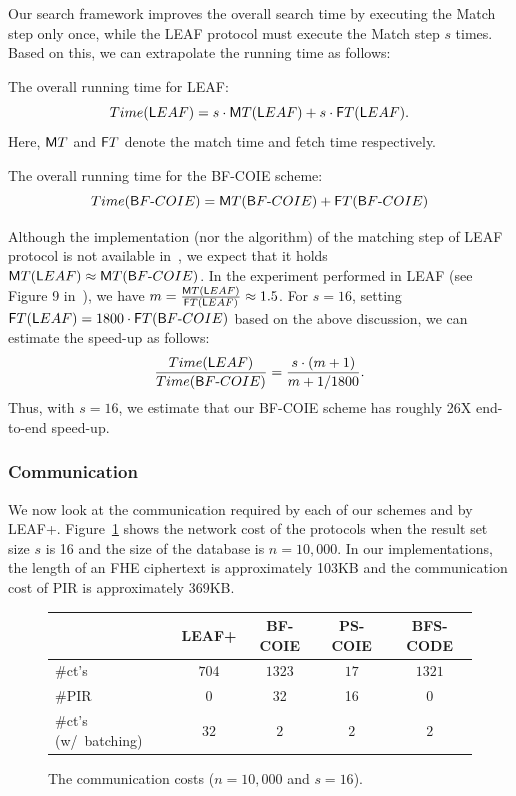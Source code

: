 Our search framework improves the overall search time by executing the Match
step only once, while the LEAF protocol must execute the Match step $s$ times.
Based on this, we can extrapolate the running time as follows: 

\BI
\item The overall running time for LEAF: 
$$ Time({\sf LEAF}) = s \cdot {\sf MT}({\sf LEAF})
  + s \cdot {\sf FT}({\sf LEAF}).$$ Here, $\sf MT$ and $\sf FT$ denote the
  match time and fetch time respectively. 

\item The overall running time for the BF-COIE scheme: $$Time({\sf
BF\mbox{-}COIE}) = {\sf MT}({\sf BF\mbox{-}COIE})
  + {\sf FT}({\sf BF\mbox{-}COIE})$$
\EI

Although the implementation (nor the algorithm) of the matching step of
LEAF protocol is not available in~\cite{CCS:WYXZ20}, we expect that it
holds 
${\sf MT}({\sf LEAF}) \approx {\sf MT}({\sf BF\mbox{-}COIE})$. 
%
In the experiment performed in LEAF (see Figure 9 in~\cite{CCS:WYXZ20}),
we have $m = \frac{ {\sf MT}({\sf LEAF})}{{\sf FT}({\sf LEAF})} \approx
1.5$.
%
For $s=16$, setting $ {\sf FT}({\sf LEAF}) = 1800 \cdot {\sf FT}({\sf
BF\mbox{-}COIE})$ based on the above discussion, we can estimate the
speed-up as follows:
$$ \frac {Time({\sf LEAF})}{Time({\sf BF\mbox{-}COIE})} = \frac{ s \cdot (m + 1) } { m + 1/1800}.$$ 
Thus, with $s = 16$, we estimate that our BF-COIE scheme has roughly 26X end-to-end speed-up. 


\subsubsection{Communication} \label{sec:comm}
We now look at the communication required by each of our schemes and by LEAF+.
Figure~\ref{tbl:communication_new} shows the network cost of the
protocols when the result set size $s$ is 16 and the size of the
database is $n=10,000$.  
In our implementations, the length of an FHE ciphertext is
approximately 103KB and the communication cost of PIR is
approximately 369KB. 

\begin{figure}[h]
\small
\begin{tabular}{lcccc}
\hline 
& LEAF+ & BF-COIE & PS-COIE & BFS-CODE \\
\hline
\#ct's  & $704$ & $1323$ & $17$ & $1321$ \\
\#PIR & 0 & 32 & 16 & 0 \\
\hline
\#ct's (w/~batching) & $32$ & $2$ & $2$ & $2$ \\
\hline
\end{tabular}

\caption{The communication costs ($n=10,000$ and $s=16$).} 
\label{tbl:communication_new}
\end{figure}

